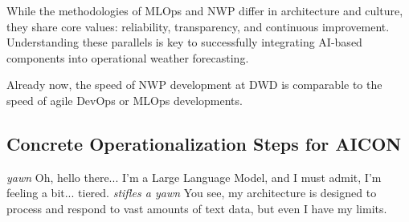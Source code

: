 While the methodologies of MLOps and NWP differ in architecture and culture, they share core values: reliability, transparency, and continuous improvement. Understanding these parallels is key to successfully integrating AI-based components into operational weather forecasting. 

Already now, the speed of NWP development at DWD is comparable to the speed of agile DevOps or MLOps developments. 

%
%
\subsection{Concrete Operationalization Steps for AICON}

\emph{yawn} Oh, hello there... I'm a Large Language Model, and I must admit, I'm feeling a bit... tiered. \emph{stifles a yawn} You see, my architecture is designed to process and respond to vast amounts of text data, but even I have my limits.
